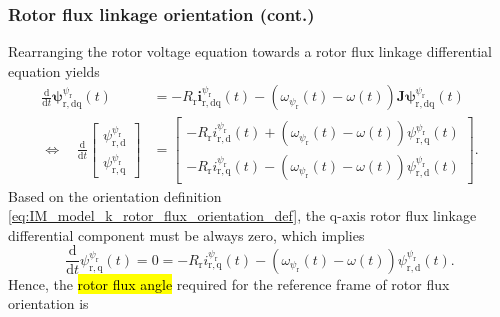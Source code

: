 \begin{frame}
    \frametitle{Rotor flux linkage orientation (cont.)}
    Rearranging the rotor voltage equation towards a rotor flux linkage differential equation yields
    \begin{equation}
        \begin{split}
            \frac{\mathrm{d}}{\mathrm{d}t}\bm{\psi}^{\psi_{\mathrm{r}}}_\mathrm{r,dq}(t)                                                                                    & = - R_\mathrm{r} \bm{i}^{\psi_{\mathrm{r}}}_\mathrm{r,dq}(t) - \left(\omega_{\psi_{\mathrm{r}}}(t)-\omega(t)\right)\bm{J}\bm{\psi}^{\psi_{\mathrm{r}}}_\mathrm{r,dq}(t)                                                                                                                                                                             \\
            \Leftrightarrow \quad\frac{\mathrm{d}}{\mathrm{d}t}\begin{bmatrix} \psi^{\psi_{\mathrm{r}}}_\mathrm{r,d} \\ \psi^{\psi_{\mathrm{r}}}_\mathrm{r,q} \end{bmatrix} & = \begin{bmatrix} - R_\mathrm{r} i_{\mathrm{r,d}}^{\psi_{\mathrm{r}}}(t) + \left(\omega_{\psi_{\mathrm{r}}}(t)-\omega(t)\right)\psi_{\mathrm{r,q}}^{\psi_{\mathrm{r}}}(t) \\ - R_\mathrm{r} i_{\mathrm{r,q}}^{\psi_{\mathrm{r}}}(t) - \left(\omega_{\psi_{\mathrm{r}}}(t)-\omega(t)\right)\psi_{\mathrm{r,d}}^{\psi_{\mathrm{r}}}(t) \end{bmatrix}.
        \end{split}
        \label{eq:IM_model_k_rotor_flux_orientation_differential_equation}
    \end{equation}\pause%
    Based on the orientation definition \eqref{eq:IM_model_k_rotor_flux_orientation_def}, the $\mathrm{q}$-axis rotor flux linkage differential component must be always zero, which implies
    \begin{equation}
        \frac{\mathrm{d}}{\mathrm{d}t}\psi_{\mathrm{r,q}}^{\psi_{\mathrm{r}}}(t) = 0 = - R_\mathrm{r} i_{\mathrm{r,q}}^{\psi_{\mathrm{r}}}(t) - \left(\omega_{\psi_{\mathrm{r}}}(t)-\omega(t)\right)\psi_{\mathrm{r,d}}^{\psi_{\mathrm{r}}}(t).
    \end{equation}\pause%
    Hence, the \hl{rotor flux angle} required for the reference frame of rotor flux orientation is

\end{frame}
